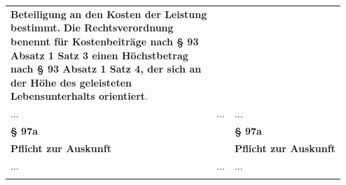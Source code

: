\documentclass[10pt,a4paper,landscape]{article}
\begin{document}
\begin{longtable}{|L{8.2cm}|L{8.2cm}|L{8.2cm}|}
\textbf{\textcolor{diffgreen}{Beteiligung}}\textbf{ an den Kosten der Leistung  \newline bestimmt. }\textbf{\textcolor{diffgreen}{Die Rechtsverordnung  \newline benennt für Kostenbeiträge nach \S{} 93  \newline Absatz 1 Satz 3 einen Höchstbetrag  \newline nach \S{} 93 Absatz 1 Satz 4, der sich an  \newline der Höhe des geleisteten  \newline Lebensunterhalts orientiert}}\textcolor{diffgreen}{.} \\
\hhline{|---|}
... & ... & ... \\
\hhline{|---|}
\textbf{\S{} 97a} &  & \textbf{\S{} 97a} \\
\hhline{|---|}
\textbf{Pflicht zur Auskunft} &  & \textbf{Pflicht zur Auskunft} \\
\hhline{|---|}
... & ... & ... \\
\hhline{|---|}

\end{longtable}
\end{document}
